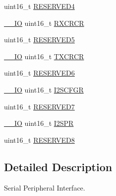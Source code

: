 \begin{DoxyCompactItemize}
\item 
uint16\-\_\-t \hyperlink{struct_s_p_i___type_def_aa0223808025f5bf9c056185038c9d545}{R\-E\-S\-E\-R\-V\-E\-D4}
\item 
\hyperlink{group___c_m_s_i_s__core__definitions_gaec43007d9998a0a0e01faede4133d6be}{\-\_\-\-\_\-\-I\-O} uint16\-\_\-t \hyperlink{struct_s_p_i___type_def_a7ad53aa3735ccdd785e3eec02faf5eb9}{R\-X\-C\-R\-C\-R}
\item 
uint16\-\_\-t \hyperlink{struct_s_p_i___type_def_abd36010ac282682d1f3c641b183b1b6f}{R\-E\-S\-E\-R\-V\-E\-D5}
\item 
\hyperlink{group___c_m_s_i_s__core__definitions_gaec43007d9998a0a0e01faede4133d6be}{\-\_\-\-\_\-\-I\-O} uint16\-\_\-t \hyperlink{struct_s_p_i___type_def_a0238d40f977d03709c97033b8379f98f}{T\-X\-C\-R\-C\-R}
\item 
uint16\-\_\-t \hyperlink{struct_s_p_i___type_def_aab502dde158ab7da8e7823d1f8a06edb}{R\-E\-S\-E\-R\-V\-E\-D6}
\item 
\hyperlink{group___c_m_s_i_s__core__definitions_gaec43007d9998a0a0e01faede4133d6be}{\-\_\-\-\_\-\-I\-O} uint16\-\_\-t \hyperlink{struct_s_p_i___type_def_acb40abca5ca4cd2b2855adf2186effe8}{I2\-S\-C\-F\-G\-R}
\item 
uint16\-\_\-t \hyperlink{struct_s_p_i___type_def_ab1820c97e368d349f5f4121f015d9fab}{R\-E\-S\-E\-R\-V\-E\-D7}
\item 
\hyperlink{group___c_m_s_i_s__core__definitions_gaec43007d9998a0a0e01faede4133d6be}{\-\_\-\-\_\-\-I\-O} uint16\-\_\-t \hyperlink{struct_s_p_i___type_def_a02ce1ece243cc4ce1d66ebeca247fee1}{I2\-S\-P\-R}
\item 
uint16\-\_\-t \hyperlink{struct_s_p_i___type_def_afc22764fbf9ee7ce28174d65d0260f18}{R\-E\-S\-E\-R\-V\-E\-D8}
\end{DoxyCompactItemize}


\subsection{Detailed Description}
Serial Peripheral Interface. 

